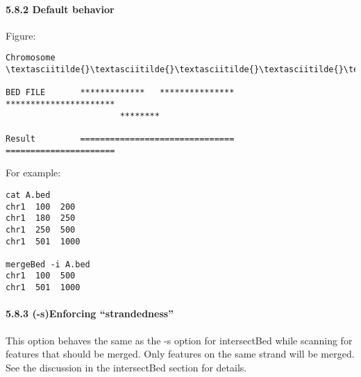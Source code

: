 \documentclass[letterpaper,10pt,english]{sphinxmanual}
\begin{document}
\paragraph{5.8.2 Default behavior}
\label{content/mergeBed:default-behavior}
Figure:

\begin{Verbatim}[commandchars=\\\{\}]
Chromosome  \textasciitilde{}\textasciitilde{}\textasciitilde{}\textasciitilde{}\textasciitilde{}\textasciitilde{}\textasciitilde{}\textasciitilde{}\textasciitilde{}\textasciitilde{}\textasciitilde{}\textasciitilde{}\textasciitilde{}\textasciitilde{}\textasciitilde{}\textasciitilde{}\textasciitilde{}\textasciitilde{}\textasciitilde{}\textasciitilde{}\textasciitilde{}\textasciitilde{}\textasciitilde{}\textasciitilde{}\textasciitilde{}\textasciitilde{}\textasciitilde{}\textasciitilde{}\textasciitilde{}\textasciitilde{}\textasciitilde{}\textasciitilde{}\textasciitilde{}\textasciitilde{}\textasciitilde{}\textasciitilde{}\textasciitilde{}\textasciitilde{}\textasciitilde{}\textasciitilde{}\textasciitilde{}\textasciitilde{}\textasciitilde{}\textasciitilde{}\textasciitilde{}\textasciitilde{}\textasciitilde{}\textasciitilde{}\textasciitilde{}\textasciitilde{}\textasciitilde{}\textasciitilde{}\textasciitilde{}\textasciitilde{}\textasciitilde{}\textasciitilde{}\textasciitilde{}\textasciitilde{}\textasciitilde{}\textasciitilde{}\textasciitilde{}\textasciitilde{}\textasciitilde{}\textasciitilde{}

BED FILE       *************   ***************   **********************
                       ********

Result         ===============================   ======================
\end{Verbatim}

For example:

\begin{Verbatim}[commandchars=\\\{\}]
cat A.bed
chr1  100  200
chr1  180  250
chr1  250  500
chr1  501  1000

mergeBed -i A.bed
chr1  100  500
chr1  501  1000
\end{Verbatim}


\paragraph{5.8.3 (-s)Enforcing ``strandedness''}
\label{content/mergeBed:s-enforcing-strandedness}
This option behaves the same as the -s option for intersectBed while scanning for features that should
be merged. Only features on the same strand will be merged. See the discussion in the intersectBed
section for details.
\end{document}
